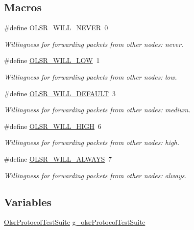 \subsection*{Macros}
\begin{DoxyCompactItemize}
\item 
\#define \hyperlink{olsr-routing-protocol-test-suite_8cc_a146d2c103abd49bdfad44b4424769696}{O\+L\+S\+R\+\_\+\+W\+I\+L\+L\+\_\+\+N\+E\+V\+ER}~0
\begin{DoxyCompactList}\small\item\em Willingness for forwarding packets from other nodes\+: never. \end{DoxyCompactList}\item 
\#define \hyperlink{olsr-routing-protocol-test-suite_8cc_af5179e8ea62927c15150f279ce4bf0c7}{O\+L\+S\+R\+\_\+\+W\+I\+L\+L\+\_\+\+L\+OW}~1
\begin{DoxyCompactList}\small\item\em Willingness for forwarding packets from other nodes\+: low. \end{DoxyCompactList}\item 
\#define \hyperlink{olsr-routing-protocol-test-suite_8cc_a0b87d49ad8114eabe8dd6eecfb6858e1}{O\+L\+S\+R\+\_\+\+W\+I\+L\+L\+\_\+\+D\+E\+F\+A\+U\+LT}~3
\begin{DoxyCompactList}\small\item\em Willingness for forwarding packets from other nodes\+: medium. \end{DoxyCompactList}\item 
\#define \hyperlink{olsr-routing-protocol-test-suite_8cc_ac18eca80c0f239fb80d32461d51e3644}{O\+L\+S\+R\+\_\+\+W\+I\+L\+L\+\_\+\+H\+I\+GH}~6
\begin{DoxyCompactList}\small\item\em Willingness for forwarding packets from other nodes\+: high. \end{DoxyCompactList}\item 
\#define \hyperlink{olsr-routing-protocol-test-suite_8cc_a47254d140ed26351d672c338a8cda435}{O\+L\+S\+R\+\_\+\+W\+I\+L\+L\+\_\+\+A\+L\+W\+A\+YS}~7
\begin{DoxyCompactList}\small\item\em Willingness for forwarding packets from other nodes\+: always. \end{DoxyCompactList}\end{DoxyCompactItemize}
\subsection*{Variables}
\begin{DoxyCompactItemize}
\item 
\hyperlink{classOlsrProtocolTestSuite}{Olsr\+Protocol\+Test\+Suite} \hyperlink{olsr-routing-protocol-test-suite_8cc_ace56e07d606bbc9a0f942cda0d61bdf2}{g\+\_\+olsr\+Protocol\+Test\+Suite}
\end{DoxyCompactItemize}


